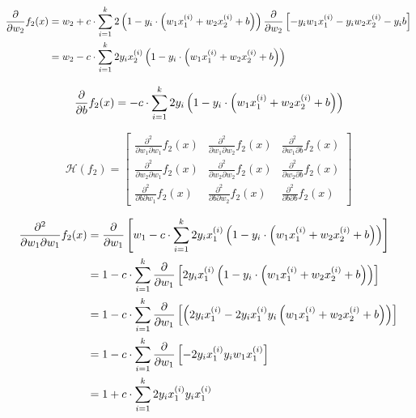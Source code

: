 \documentclass[12pt,landscape]{article}
\begin{document}
\newcommand{\lTwoLossDwOne}{w_1 -c \cdot \sum\limits_{i=1}^k  2y_i  x_1^{(i)} \left( \lTwoLoss \right)}


\begin{align}
\frac{\partial}{\partial w_2} f_2(x)
&= w_2 +c \cdot \sum\limits_{i=1}^k  2\left( 1-y_i \cdot \left( w_1 x_1^{(i)} + w_2 x_2^{(i)} + b\right) \right) \frac{\partial}{\partial w_2}  \left[ -y_i w_1  x_1^{(i)} -y_i w_2  x_2^{(i)} -y_i b \right]\nonumber\\ 
&= w_2 -c \cdot \sum\limits_{i=1}^k  2y_i  x_2^{(i)} \left( 1-y_i \cdot \left( w_1 x_1^{(i)} + w_2 x_2^{(i)} + b\right) \right) \\ 
\end{align}

\newcommand{\lTwoLossDwTwo}{w_2 -c \cdot \sum\limits_{i=1}^k  2y_i  x_2^{(i)} \left( \lTwoLoss \right)}


\begin{align}
\frac{\partial}{\partial b} f_2(x) &= - c \cdot \sum\limits_{i=1}^k 2 y_i  \left( 1-y_i \cdot \left( w_1 x_1^{(i)} + w_2 x_2^{(i)} + b\right) \right)\\
\end{align}

\newcommand{\lTwoLossDwb}{- c \cdot \sum\limits_{i=1}^k 2 y_i  \left( \lTwoLoss \right)}

\begin{equation}
\mathcal{H}(f_2) = \begin{bmatrix}
\frac{\partial^2}{\partial w_1 \partial w_1} f_2(x) & \frac{\partial^2}{\partial w_1 \partial w_2} f_2(x) & \frac{\partial^2}{\partial w_1 \partial b} f_2(x)\\
\frac{\partial^2}{\partial w_2 \partial w_1} f_2(x) & \frac{\partial^2}{\partial w_2 \partial w_2} f_2(x) & \frac{\partial^2}{\partial w_2 \partial b}f_2(x)\\
\frac{\partial^2}{\partial b \partial w_1}f_2(x) & \frac{\partial^2}{\partial b \partial w_2} f_2(x) & \frac{\partial^2}{\partial b \partial b}f_2(x)
\end{bmatrix}
\end{equation}

\begin{align}
\frac{\partial^2}{\partial w_1 \partial w_1} f_2(x) 
&=  \frac{\partial}{\partial w_1} \left[  \lTwoLossDwOne \right]\\   \nonumber
&= 1 -   c \cdot \sum\limits_{i=1}^k  \frac{\partial}{\partial w_1} \left[ 2y_i  x_1^{(i)} \left( \lTwoLoss \right) \right]\\ \nonumber
&= 1 -   c \cdot \sum\limits_{i=1}^k  \frac{\partial}{\partial w_1} \left[  \left( 2y_i  x_1^{(i)} - 2y_i  x_1^{(i)}y_i\left( w_1  x_1^{(i)} + w_2  x_2^{(i)} + b\right) \right) \right]\\ \nonumber
&= 1 -   c \cdot \sum\limits_{i=1}^k  \frac{\partial}{\partial w_1} \left[  - 2y_i  x_1^{(i)}y_i w_1  x_1^{(i)}  \right]\\ \nonumber
&= 1 +   c \cdot \sum\limits_{i=1}^k 2y_i  x_1^{(i)}y_i  x_1^{(i)}
\end{align}
\end{document}
